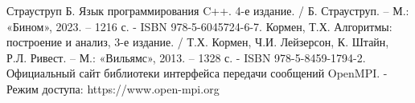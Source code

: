 \begin{thebibliography}{3}
Страуструп Б. Язык программирования C++. 4-е издание. / Б. Страуструп. – М.: «Бином», 2023. – 1216 с. - ISBN 978-5-6045724-6-7.
Кормен, Т.Х. Алгоритмы: построение и анализ, 3-е издание. / Т.Х. Кормен, Ч.И. Лейзерсон, К. Штайн, Р.Л. Ривест. – М.: «Вильямс», 2013. – 1328 с. - ISBN 978-5-8459-1794-2.
Официальный сайт библиотеки интерфейса передачи сообщений OpenMPI. - Режим доступа: https://www.open-mpi.org
\end{thebibliography}
